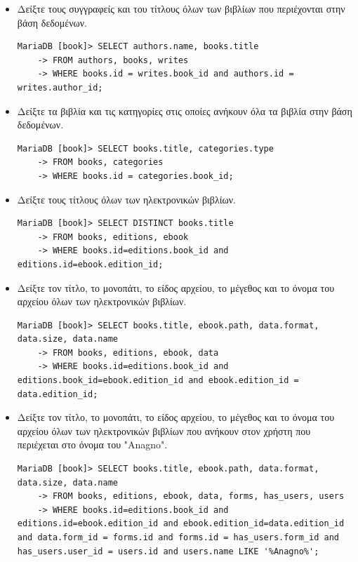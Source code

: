 \documentclass{assignment}
\begin{document}
\begin{itemize}

\item Δείξτε τους συγγραφείς και του τίτλους όλων των βιβλίων που περιέχονται στην βάση δεδομένων.
\begin{verbatim}
MariaDB [book]> SELECT authors.name, books.title 
    -> FROM authors, books, writes 
    -> WHERE books.id = writes.book_id and authors.id = writes.author_id;
\end{verbatim}

\item Δείξτε τα βιβλία και τις κατηγορίες στις οποίες ανήκουν όλα τα βιβλία στην βάση δεδομένων.
\begin{verbatim}
MariaDB [book]> SELECT books.title, categories.type 
    -> FROM books, categories 
    -> WHERE books.id = categories.book_id;
\end{verbatim}

\item Δείξτε τους τίτλους όλων των ηλεκτρονικών βιβλίων.
\begin{verbatim}
MariaDB [book]> SELECT DISTINCT books.title
    -> FROM books, editions, ebook
    -> WHERE books.id=editions.book_id and editions.id=ebook.edition_id;
\end{verbatim}

\item Δείξτε τον τίτλο, το μονοπάτι, το είδος αρχείου, το μέγεθος και το όνομα του αρχείου όλων των ηλεκτρονικών βιβλίων.
\begin{verbatim}
MariaDB [book]> SELECT books.title, ebook.path, data.format, data.size, data.name 
    -> FROM books, editions, ebook, data 
    -> WHERE books.id=editions.book_id and editions.book_id=ebook.edition_id and ebook.edition_id = data.edition_id;
\end{verbatim}

\item Δείξτε τον τίτλο, το μονοπάτι, το είδος αρχείου, το μέγεθος και το όνομα του αρχείου όλων των ηλεκτρονικών βιβλίων που ανήκουν στον χρήστη που περιέχεται στο όνομα του "Anagno".
\begin{verbatim}
MariaDB [book]> SELECT books.title, ebook.path, data.format, data.size, data.name 
    -> FROM books, editions, ebook, data, forms, has_users, users 
    -> WHERE books.id=editions.book_id and editions.id=ebook.edition_id and ebook.edition_id=data.edition_id and data.form_id = forms.id and forms.id = has_users.form_id and has_users.user_id = users.id and users.name LIKE '%Anagno%';
\end{verbatim}


\end{itemize}
\end{document}
